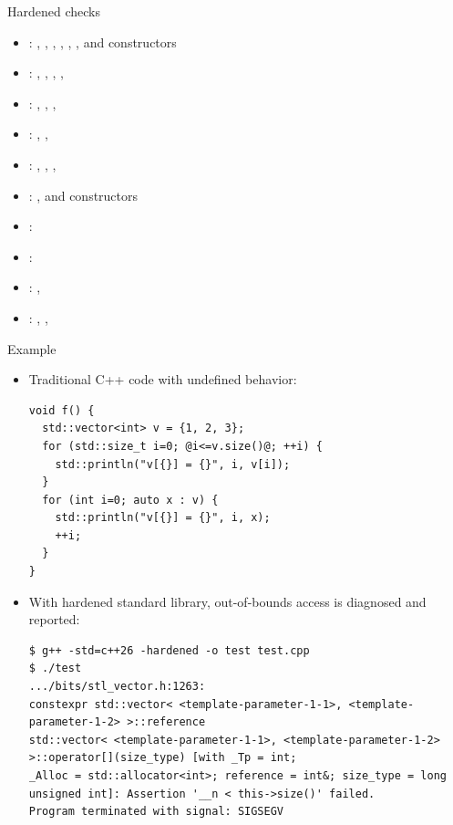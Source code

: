 \begin{frame}[t,fragile]{Hardened checks}
\begin{itemize}
  \item {}: , , , , , , and constructors
  \item {}: , , , , 
  \item {}: , , , 
  \item {}: , , 
  \item {}: , , , 
  \item {}: , and constructors
  \item {}: 
  \item {}: 
  \item {}: , 
  \item {}: , , 
\end{itemize}
\end{frame}

\begin{frame}[t,fragile]{Example}
  \begin{itemize}
    \item Traditional C++ code with undefined behavior:
\begin{lstlisting}[moredelim={[is][\color{red}\textbf]{@}{@}}]
void f() {
  std::vector<int> v = {1, 2, 3};
  for (std::size_t i=0; @i<=v.size()@; ++i) {
    std::println("v[{}] = {}", i, v[i]);
  }
  for (int i=0; auto x : v) {
    std::println("v[{}] = {}", i, x);
    ++i;
  }
}
\end{lstlisting}

    \item With hardened standard library, out-of-bounds access is diagnosed and reported:
\begin{lstlisting}[style=terminal,basicstyle=\ttfamily\tiny]
$ g++ -std=c++26 -hardened -o test test.cpp
$ ./test
.../bits/stl_vector.h:1263:
constexpr std::vector< <template-parameter-1-1>, <template-parameter-1-2> >::reference 
std::vector< <template-parameter-1-1>, <template-parameter-1-2> >::operator[](size_type) [with _Tp = int; 
_Alloc = std::allocator<int>; reference = int&; size_type = long unsigned int]: Assertion '__n < this->size()' failed.
Program terminated with signal: SIGSEGV
\end{lstlisting}
  \end{itemize}
\end{frame}